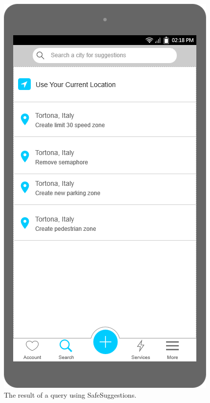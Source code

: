 \documentclass[a4paper]{article}
\newcommand{\mockupsize}{0.36\textwidth}
\begin{document}
\begin{figure}[H]
    \centering
    \begin{minipage}[t]{\mockupsize}
        \includegraphics[width=\textwidth]{mockup/get_suggestions}
        \caption{The result of a query using SafeSuggestions.}
    \end{minipage}
\end{figure}
\end{document}
